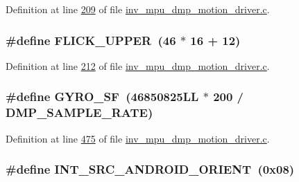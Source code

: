 Definition at line \hyperlink{inv__mpu__dmp__motion__driver_8c_source_l00209}{209} of file \hyperlink{inv__mpu__dmp__motion__driver_8c_source}{inv\+\_\+mpu\+\_\+dmp\+\_\+motion\+\_\+driver.\+c}.

\subsubsection[{\texorpdfstring{F\+L\+I\+C\+K\+\_\+\+U\+P\+P\+ER}{FLICK_UPPER}}]{\setlength{\rightskip}{0pt plus 5cm}\#define F\+L\+I\+C\+K\+\_\+\+U\+P\+P\+ER~(46 $\ast$ 16 + 12)}\hypertarget{group___d_r_i_v_e_r_s_gadf0738d3c6f0096ecb157aa2b296f1e1}{}\label{group___d_r_i_v_e_r_s_gadf0738d3c6f0096ecb157aa2b296f1e1}


Definition at line \hyperlink{inv__mpu__dmp__motion__driver_8c_source_l00212}{212} of file \hyperlink{inv__mpu__dmp__motion__driver_8c_source}{inv\+\_\+mpu\+\_\+dmp\+\_\+motion\+\_\+driver.\+c}.

\subsubsection[{\texorpdfstring{G\+Y\+R\+O\+\_\+\+SF}{GYRO_SF}}]{\setlength{\rightskip}{0pt plus 5cm}\#define G\+Y\+R\+O\+\_\+\+SF~(46850825\+L\+L $\ast$ 200 / D\+M\+P\+\_\+\+S\+A\+M\+P\+L\+E\+\_\+\+R\+A\+T\+E)}\hypertarget{group___d_r_i_v_e_r_s_gac0325c658f2911bdfc3b44fca31c684f}{}\label{group___d_r_i_v_e_r_s_gac0325c658f2911bdfc3b44fca31c684f}


Definition at line \hyperlink{inv__mpu__dmp__motion__driver_8c_source_l00475}{475} of file \hyperlink{inv__mpu__dmp__motion__driver_8c_source}{inv\+\_\+mpu\+\_\+dmp\+\_\+motion\+\_\+driver.\+c}.

\subsubsection[{\texorpdfstring{I\+N\+T\+\_\+\+S\+R\+C\+\_\+\+A\+N\+D\+R\+O\+I\+D\+\_\+\+O\+R\+I\+E\+NT}{INT_SRC_ANDROID_ORIENT}}]{\setlength{\rightskip}{0pt plus 5cm}\#define I\+N\+T\+\_\+\+S\+R\+C\+\_\+\+A\+N\+D\+R\+O\+I\+D\+\_\+\+O\+R\+I\+E\+NT~(0x08)}\hypertarget{group___d_r_i_v_e_r_s_ga7c3f4a57d404a1321ce6dfc00e33ac4d}{}\label{group___d_r_i_v_e_r_s_ga7c3f4a57d404a1321ce6dfc00e33ac4d}


